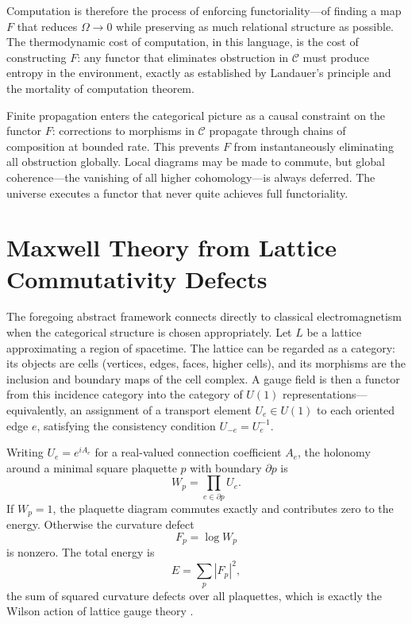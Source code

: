 \documentclass[12pt,a4paper,openany]{book}
\theoremstyle{plain}
\theoremstyle{definition}
\theoremstyle{remark}
\newcommand{\Energy}{E}
\begin{document}
Computation is therefore the process of enforcing functoriality---of finding a map $F$ that reduces $\Omega \to 0$ while preserving as much relational structure as possible. The thermodynamic cost of computation, in this language, is the cost of constructing $F$: any functor that eliminates obstruction in $\mathcal{C}$ must produce entropy in the environment, exactly as established by Landauer's principle and the mortality of computation theorem.

Finite propagation enters the categorical picture as a causal constraint on the functor $F$: corrections to morphisms in $\mathcal{C}$ propagate through chains of composition at bounded rate. This prevents $F$ from instantaneously eliminating all obstruction globally. Local diagrams may be made to commute, but global coherence---the vanishing of all higher cohomology---is always deferred. The universe executes a functor that never quite achieves full functoriality.

\section{Maxwell Theory from Lattice Commutativity Defects}

The foregoing abstract framework connects directly to classical electromagnetism when the categorical structure is chosen appropriately. Let $L$ be a lattice approximating a region of spacetime. The lattice can be regarded as a category: its objects are cells (vertices, edges, faces, higher cells), and its morphisms are the inclusion and boundary maps of the cell complex. A gauge field is then a functor from this incidence category into the category of $U(1)$ representations---equivalently, an assignment of a transport element $U_e \in U(1)$ to each oriented edge $e$, satisfying the consistency condition $U_{-e} = U_e^{-1}$.

Writing $U_e = e^{i A_e}$ for a real-valued connection coefficient $A_e$, the holonomy around a minimal square plaquette $p$ with boundary $\partial p$ is
\[
W_p = \prod_{e \in \partial p} U_e.
\]
If $W_p = 1$, the plaquette diagram commutes exactly and contributes zero to the energy. Otherwise the curvature defect
\[
F_p = \log W_p
\]
is nonzero. The total energy is
\[
\Energy = \sum_p |F_p|^2,
\]
the sum of squared curvature defects over all plaquettes, which is exactly the Wilson action of lattice gauge theory \cite{WilsonLattice1974}.
\end{document}
